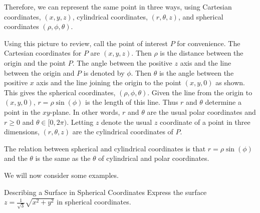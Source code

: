 \begin{center}
\end{center}

Therefore, we can represent the same point in three ways, using Cartesian coordinates, $\left(x,y,z\right)$, cylindrical coordinates, $\left( r, \theta, z \right)$, and spherical coordinates $\left( \rho, \phi, \theta \right)$. 

Using this picture to review, call the point of interest $P$ for convenience. The Cartesian coordinates for $P$ are $(x,y,z)$. Then $\rho $ is the distance between the origin and the point $P$. The angle between
the positive $z$ axis and the line between the origin and $P$
 is denoted by $\phi $. Then $\theta $ is the angle
between the positive $x$ axis and the line joining the origin to the point 
$\left( x,y,0\right) $ as shown. This gives the spherical coordinates, $( \rho, \phi, \theta)$. Given the line from the origin to $\left( x,y,0\right) $,  $r=\rho \sin(\phi)$ is the length of this
line. Thus $r$ and $\theta $ determine a point in the $xy$-plane. In other words, $r$ and $\theta $ are the usual polar coordinates and $r\geq 0$ and $\theta \in \lbrack 0,2\pi )$. Letting $z$ denote the usual 
$z$ coordinate of a point in three dimensions, 
$\left( r,\theta ,z\right) $ are the cylindrical coordinates of $P$. 

The relation between spherical and cylindrical coordinates is that $r=\rho
\sin(\phi)$ and the $\theta$ is the same as the $\theta$ of cylindrical and polar
coordinates. 

We will now consider some examples.

\begin{example}{Describing a Surface in Spherical Coordinates}
Express the surface $z=\frac{1}{\sqrt{3}}\sqrt{x^{2}+y^{2}}$ in spherical
coordinates.
\end{example}

